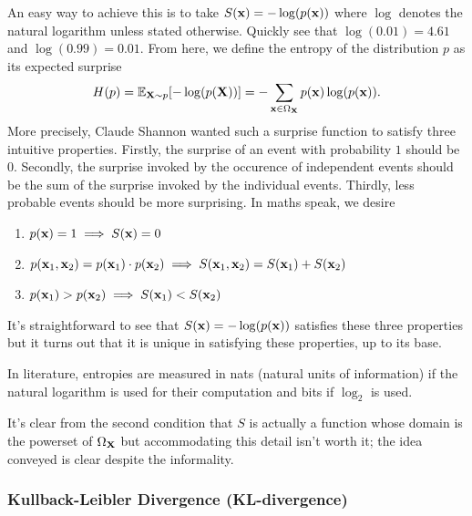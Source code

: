\documentclass[11pt]{article}
\begin{document}
\begin{appendices}
An easy way to achieve this is to take $S(\mathbf{x})=-\log(p(\mathbf{x}))$ where $\log$ denotes the natural logarithm unless stated otherwise. Quickly see that $\log(0.01)=4.61$ and $\log(0.99)=0.01$. From here, we define the entropy of the distribution $p$ as its expected surprise
$$
H(p)
=
\mathbb{E}_{\mathbf{X}\sim p}[-\log(p(\mathbf{X}))]
=
-\sum_{\mathbf{x}\in \Omega_{\mathbf{X}}}p(\mathbf{x})\log(p(\mathbf{x})).
$$
More precisely, Claude Shannon wanted such a surprise function to satisfy three intuitive properties. Firstly, the surprise of an event with probability $1$ should be $0$. Secondly, the surprise invoked by the occurence of independent events should be the sum of the surprise invoked by the individual events. Thirdly, less probable events should be more surprising. In maths speak, we desire
\begin{enumerate}
    \item $p(\mathbf{x})=1\implies S(\mathbf{x})=0$
    \item $p(\mathbf{x}_1,\mathbf{x}_2)=p(\mathbf{x}_1)\cdot p(\mathbf{x}_2)\implies S(\mathbf{x}_1,\mathbf{x}_2)=S(\mathbf{x}_1)+S(\mathbf{x}_2)$
    \item $p(\mathbf{x}_1)>p(\mathbf{x}_2)\implies S(\mathbf{x}_1)<S(\mathbf{x}_2)$
\end{enumerate}
It's straightforward to see that $S(\mathbf{x})=-\log(p(\mathbf{x}))$ satisfies these three properties but it turns out that it is unique in satisfying these properties, up to its base.

In literature, entropies are measured in nats (natural units of information) if the natural logarithm is used for their computation and bits if $\log_2$ is used.

\begin{tcolorbox}[title={\centering\textbf{Technical note regarding} $\text{dom}(S)$}, colback=myLightBlue, colbacktitle=myDarkBlue, colframe=myDarkBlue, coltitle=white]
    It's clear from the second condition that $S$ is actually a function whose domain is the powerset of $\Omega_{\mathbf{X}}$ but accommodating this detail isn't worth it; the idea conveyed is clear despite the informality.
\end{tcolorbox}

\subsubsection{Kullback-Leibler Divergence (KL-divergence)}


\end{appendices}
\end{document}
